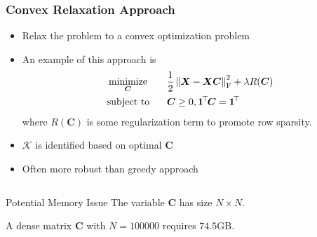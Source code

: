 \documentclass[10pt,xcolor={usenames,dvipsnames,table}]{beamer}
\def\blue{\color{blue}}
\newcommand{\norm}[1]{\left\lVert#1\right\rVert}
\newcommand{\T}{\!\top\!}
\DeclareMathOperator*{\minimize}{minimize}
\newcommand{\citep}[1]{{\blue \scriptsize \parencite{#1}}}
\begin{document}
\begin{frame}
    \frametitle{Convex Relaxation Approach}
    \begin{itemize}
        \item Relax the problem to a convex optimization problem \citep{gillis2018afast,gillis2014robust,gillis2013robustness,recht2012factoring,Elhamifar2012,Ammanouil2014blind}
        \item An example of this approach is \citep{esser2012convex,fu2015robust,gillis2018afast}
    \begin{alignat*}{2}
        & \minimize_{\bm{C}} \quad && \dfrac{1}{2} \norm{\bm{X} - \bm{X}\bm{C}}_{\rm F}^2 + \lambda R(\bm{C}) \\
        & \text{\rm subject to} && \bm{C} \geq 0, \bm{1}^{\T}\bm{C} = \bm{1}^{\T}
    \end{alignat*}
    where $R(\bm{C})$ is some regularization term to promote row sparsity.
\item $\mathcal{K}$ is identified based on optimal $\bm{C}$
\item Often more robust than greedy approach
    \end{itemize}

    \begin{columns}
        \begin{column}{0.6\textwidth}
        \begin{alertblock}{Potential Memory Issue}
            The variable $\bm{C}$ has size $N \times N$.
        \end{alertblock}
        A dense matrix $\bm{C}$ with $N=100000$ requires  $74.5$GB.


\end{column}
\end{columns}
\end{frame}
\end{document}
